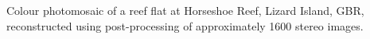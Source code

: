 Colour photomosaic of a reef flat at Horseshoe Reef, Lizard Island, GBR, reconstructed using post-processing of approximately 1600 stereo images.